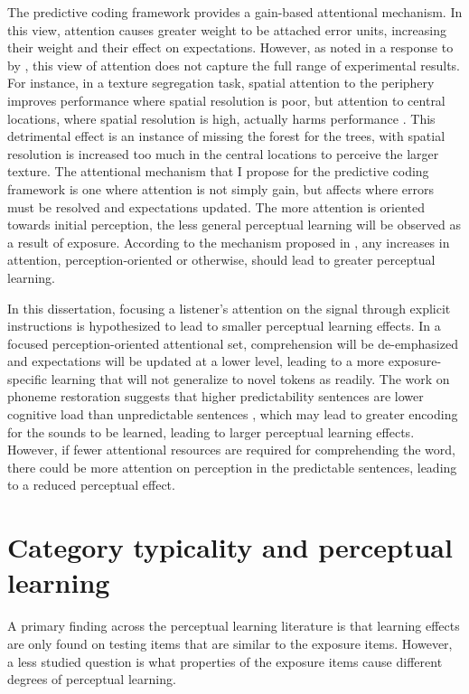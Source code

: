 The predictive coding framework \citep{Clark2013} provides a gain-based attentional mechanism.  In this view, attention causes greater weight to be attached error units, increasing their weight and their effect on expectations.  However, as noted in a response to \citet{Clark2013} by \citet{Block2013}, this view of attention does not capture the full range of experimental results.  For instance, in a texture segregation task, spatial attention to the periphery improves performance where spatial resolution is poor, but attention to central locations, where spatial resolution is high, actually harms performance \citep{Yeshurun1998}.  This detrimental effect is an instance of missing the forest for the trees, with spatial resolution is increased too much in the central locations to perceive the larger texture.  The attentional mechanism that I propose for the predictive coding framework is one where attention is not simply gain, but affects where errors must be resolved and expectations updated.  The more attention is oriented towards initial perception, the less general perceptual learning will be observed as a result of exposure.  According to the mechanism proposed in \citet{Clark2013}, any increases in attention, perception-oriented or otherwise, should lead to greater perceptual learning.

In this dissertation, focusing a listener's attention on the signal through explicit instructions is hypothesized to lead to smaller perceptual learning effects.
In a focused perception-oriented attentional set, comprehension will be de-emphasized and expectations will be updated at a lower level, leading to a more exposure-specific learning that will not generalize to novel tokens as readily.
The work on phoneme restoration suggests that higher predictability sentences are lower cognitive load than unpredictable sentences \citep{Samuel1981}, which may lead to greater encoding for the sounds to be learned, leading to larger perceptual learning effects.
However, if fewer attentional resources are required for comprehending the word, there could be more attention on perception in the predictable sentences, leading to a reduced perceptual effect.

\section{Category typicality and perceptual learning}
\label{sec:signal}

A primary finding across the perceptual learning literature is that learning effects are only found on testing items that are similar to the exposure items.  However, a less studied question is what properties of the exposure items cause different degrees of perceptual learning.  

